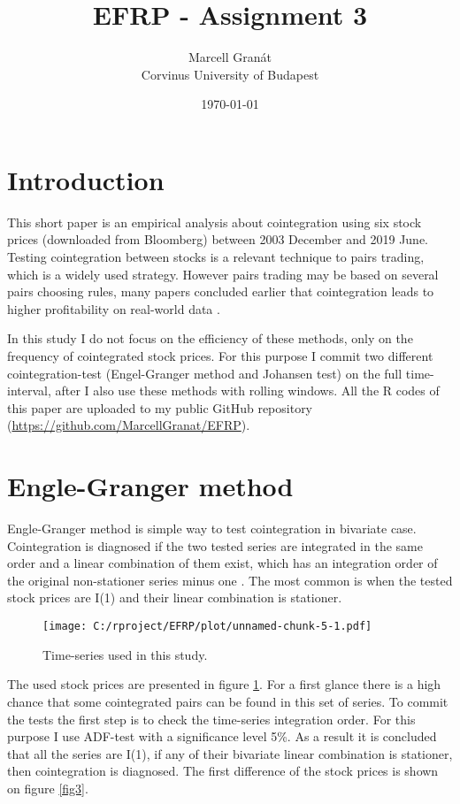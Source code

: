 \documentclass[12pt, a4paper, twoside, titlepage]{article}
\title{EFRP - Assignment 3}
\date{\today}
\author{Marcell Granát \\ Corvinus University of Budapest}
\begin{document}
  \maketitle
  \tableofcontents
  

\section{Introduction}
\setcounter{page}{1}

This short paper is an empirical analysis about cointegration using six stock prices (downloaded from Bloomberg) between 2003 December and 2019 June. Testing cointegration between stocks is a relevant technique to pairs trading, which is a widely used strategy. However pairs trading may be based on several pairs choosing rules, many papers concluded earlier that cointegration leads to higher profitability on real-world data \cite{Huck.2014}.

In this study I do not focus on the efficiency of these methods, only on the frequency of cointegrated stock prices. For this purpose I commit two different cointegration-test (Engel-Granger method and Johansen test) on the full time-interval, after I also use these methods with rolling windows. All the R codes of this paper are uploaded to my public GitHub repository (\href{https://github.com/MarcellGranat/EFRP/blob/master/Exercise-3.md}{https://github.com/MarcellGranat/EFRP}). 

\section{Engle-Granger method}

Engle-Granger method is simple way to test cointegration in bivariate case. Cointegration is diagnosed if the two tested series are integrated in the same order and a linear combination of them exist, which has an integration order of the original non-stationer series minus one \cite{Kirchgassner.2007}.
The most common is when the tested stock prices are I(1) and their linear combination is stationer.

\begin{figure}[ht]
  \centering
  \texttt{[image: C:/rproject/EFRP/plot/unnamed-chunk-5-1.pdf]}
  \caption{Time-series used in this study.}
  \label{fig1}
\end{figure}

The used stock prices are presented in figure \ref{fig1}. For a first glance there is a high chance that some cointegrated pairs can be found in this set of series. To commit the tests the first step is to check the time-series integration order. For this purpose I use ADF-test with a significance level 5\%. As a result it is concluded that all the series are I(1), if any of their bivariate linear combination is stationer, then cointegration is diagnosed. The first difference of the stock prices is shown on figure \ref{fig3}.
\end{document}
